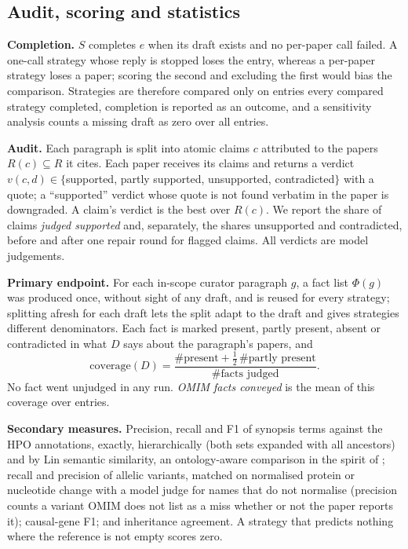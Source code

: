 \documentclass{article} %
\begin{document}
\subsection{Audit, scoring and statistics}
\label{sec:scoring}
\textbf{Completion.} $S$ completes $e$ when its draft exists and no per-paper call failed. A one-call strategy whose reply is stopped loses the entry, whereas a per-paper strategy loses a paper; scoring the second and excluding the first would bias the comparison. Strategies are therefore compared only on entries every compared strategy completed, completion is reported as an outcome, and a sensitivity analysis counts a missing draft as zero over all entries.

\textbf{Audit.} Each paragraph is split into atomic claims $c$ attributed to the papers $R(c)\subseteq R$ it cites. Each paper receives its claims and returns a verdict $v(c,d)\in\{$supported, partly supported, unsupported, contradicted$\}$ with a quote; a ``supported'' verdict whose quote is not found verbatim in the paper is downgraded. A claim's verdict is the best over $R(c)$. We report the share of claims \emph{judged supported} and, separately, the shares unsupported and contradicted, before and after one repair round for flagged claims. All verdicts are model judgements.

\textbf{Primary endpoint.} For each in-scope curator paragraph $g$, a fact list $\Phi(g)$ was produced once, without sight of any draft, and is reused for every strategy; splitting afresh for each draft lets the split adapt to the draft and gives strategies different denominators. Each fact is marked present, partly present, absent or contradicted in what $D$ says about the paragraph's papers, and
\begin{equation}
\text{coverage}(D)=\frac{\#\text{present}+\tfrac12\,\#\text{partly present}}{\#\text{facts judged}} .
\end{equation}
No fact went unjudged in any run. \emph{OMIM facts conveyed} is the mean of this coverage over entries.

\textbf{Secondary measures.} Precision, recall and F1 of synopsis terms against the HPO annotations, exactly, hierarchically (both sets expanded with all ancestors) and by Lin semantic similarity, an ontology-aware comparison in the spirit of \citet{Khler2009ClinicalDiagnostics}; recall and precision of allelic variants, matched on normalised protein or nucleotide change with a model judge for names that do not normalise (precision counts a variant OMIM does not list as a miss whether or not the paper reports it); causal-gene F1; and inheritance agreement. A strategy that predicts nothing where the reference is not empty scores zero.
\end{document}
